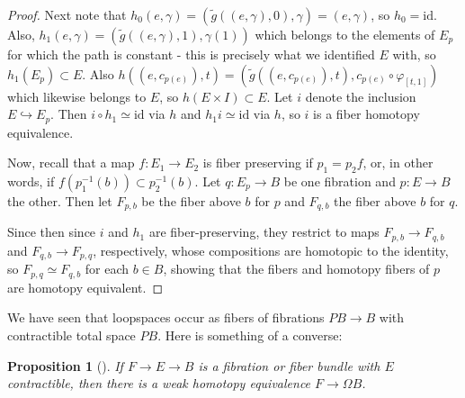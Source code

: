 \documentclass[reqno]{amsart}
\newtheorem{proposition}[theorem]{Proposition}
\theoremstyle{definition}
\theoremstyle{remark}
\newcommand{\id}{{\mathrm{id}}}
\begin{document}
\begin{proof}
          Next note that
          $h_0 \left( e,\gamma \right) 
          = \left( \tilde{g}\left( (e,\gamma),0 \right) ,
          \gamma \right) =
          \left( e, \gamma \right) $, so
          $h_0 = \id$. Also,
          $h_1 \left( e,\gamma \right) 
          = \left( \tilde{g}\left( (e,\gamma), 1 \right),
          \gamma(1) \right)$ which belongs to the elements
          of $E_p$ for which the path is constant - this is
          precisely what we identified $E$ with, so
          $h_1 (E_p) \subset E$. Also
          $h \left( (e, c_{p(e)}),t \right) 
          = \left( \tilde{g}\left( (e,c_{p(e)}),t \right) ,
          c_{p(e)} \circ \varphi_{\left[ t,1 \right] } \right) $ 
          which likewise belongs to $E$, so
          $h\left( E \times I \right) \subset E$.
          Let $i$ denote the inclusion
          $E \hookrightarrow E_p$. Then
          $i \circ h_1 \simeq \id$ via
          $h$ and $h_1 i \simeq \id$ via
          $h$, so $i$ is a fiber
          homotopy equivalence.

          Now, recall that
          a map $f \colon E_1 \to E_2$ is fiber preserving
          if $p_1 = p_2 f$, or, in other words,
          if $f \left( p_1^{-1}(b) \right) \subset 
          p_2^{-1}(b)$. 
          Let $q \colon E_p \to B$ be one fibration
          and $p \colon E \to B$ the other.
          Then let $F_{p,b}$ be the fiber
          above $b$ for $p$ and
          $F_{q,b}$ the fiber above $b$ for $q$.

          Since then
          since $i$ and $h_1$ are fiber-preserving, they
          restrict to maps
          $F_{p,b} \to F_{q,b}$ and
          $F_{q,b} \to F_{p,q}$, respectively,
          whose compositions are homotopic to the identity,
          so $F_{p,q} \simeq F_{q,b}$ for each
          $b \in B$, showing that
      the fibers and homotopy fibers of $p$ are homotopy
  equivalent.
\end{proof}


     We have seen that loopspaces occur as fibers
     of fibrations $PB \to B$ with contractible
     total space $PB$. Here is something of a converse:

     \begin{proposition}[]
         If $F \to E \to B$ is a fibration or fiber
         bundle with $E$ contractible, then
         there is a weak homotopy equivalence
         $F \to \Omega B$.
     \end{proposition}
\end{document}
